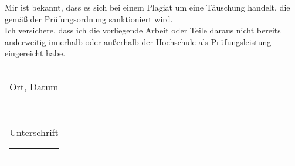 \noindent
Mir ist bekannt, dass es sich bei einem Plagiat um eine Täuschung handelt, die gemäß der Prüfungsordnung sanktioniert wird. \\



\noindent
Ich versichere, dass ich die vorliegende Arbeit oder Teile daraus nicht bereits anderweitig innerhalb oder außerhalb der Hochschule als Prüfungsleistung eingereicht habe. \\

\vspace{1.5em}

\noindent
\begin{tabular}{ll}
  Ort, Datum \rule{7cm}{0.4pt} \\[1em]
  Unterschrift \rule{7cm}{0.4pt}
\end{tabular}